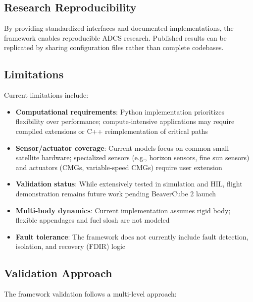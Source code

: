 \documentclass[conference]{IEEEtran}
\begin{document}
\subsection{Research Reproducibility}\label{subsec:reproducibility}

By providing standardized interfaces and documented implementations, the framework enables reproducible ADCS research. Published results can be replicated by sharing configuration files rather than complete codebases.

\subsection{Limitations}\label{subsec:limitations}

Current limitations include:

\begin{itemize}
    \item \textbf{Computational requirements}: Python implementation prioritizes flexibility over performance; compute-intensive applications may require compiled extensions or C++ reimplementation of critical paths
    \item \textbf{Sensor/actuator coverage}: Current models focus on common small satellite hardware; specialized sensors (e.g., horizon sensors, fine sun sensors) and actuators (CMGs, variable-speed CMGs) require user extension
    \item \textbf{Validation status}: While extensively tested in simulation and HIL, flight demonstration remains future work pending BeaverCube 2 launch
    \item \textbf{Multi-body dynamics}: Current implementation assumes rigid body; flexible appendages and fuel slosh are not modeled
    \item \textbf{Fault tolerance}: The framework does not currently include fault detection, isolation, and recovery (FDIR) logic
\end{itemize}


\subsection{Validation Approach}\label{subsec:validation}

The framework validation follows a multi-level approach:
\end{document}
